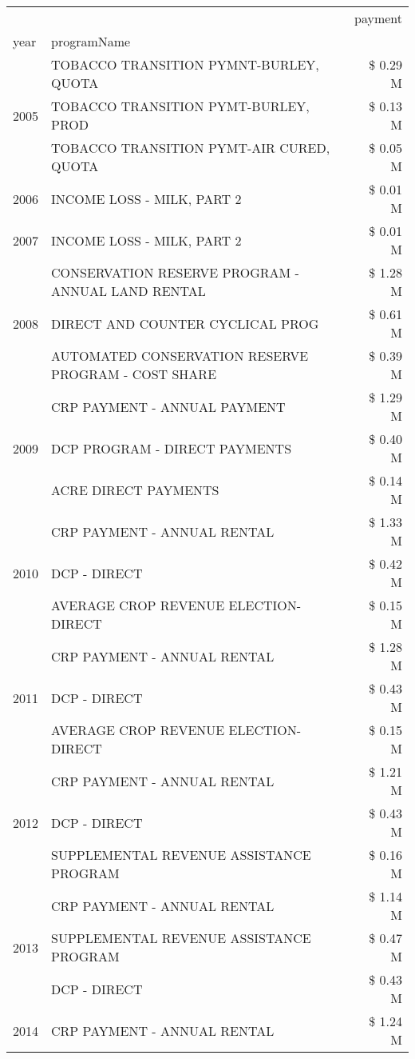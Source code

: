 \begin{tabular}{llr}
\toprule
 &  & payment \\
year & programName &  \\
\midrule
\multirow[t]{3}{*}{2005} & TOBACCO TRANSITION PYMNT-BURLEY, QUOTA & \$ 0.29 M \\
 & TOBACCO TRANSITION PYMT-BURLEY, PROD & \$ 0.13 M \\
 & TOBACCO TRANSITION PYMT-AIR CURED, QUOTA & \$ 0.05 M \\
\cline{1-3}
2006 & INCOME LOSS - MILK, PART 2 & \$ 0.01 M \\
\cline{1-3}
2007 & INCOME LOSS - MILK, PART 2 & \$ 0.01 M \\
\cline{1-3}
\multirow[t]{3}{*}{2008} & CONSERVATION RESERVE PROGRAM - ANNUAL LAND RENTAL & \$ 1.28 M \\
 & DIRECT AND COUNTER CYCLICAL PROG & \$ 0.61 M \\
 & AUTOMATED CONSERVATION RESERVE PROGRAM - COST SHARE & \$ 0.39 M \\
\cline{1-3}
\multirow[t]{3}{*}{2009} & CRP PAYMENT - ANNUAL PAYMENT & \$ 1.29 M \\
 & DCP PROGRAM - DIRECT PAYMENTS & \$ 0.40 M \\
 & ACRE DIRECT PAYMENTS & \$ 0.14 M \\
\cline{1-3}
\multirow[t]{3}{*}{2010} & CRP PAYMENT - ANNUAL RENTAL & \$ 1.33 M \\
 & DCP - DIRECT & \$ 0.42 M \\
 & AVERAGE CROP REVENUE ELECTION-DIRECT & \$ 0.15 M \\
\cline{1-3}
\multirow[t]{3}{*}{2011} & CRP PAYMENT - ANNUAL RENTAL & \$ 1.28 M \\
 & DCP - DIRECT & \$ 0.43 M \\
 & AVERAGE CROP REVENUE ELECTION-DIRECT & \$ 0.15 M \\
\cline{1-3}
\multirow[t]{3}{*}{2012} & CRP PAYMENT - ANNUAL RENTAL & \$ 1.21 M \\
 & DCP - DIRECT & \$ 0.43 M \\
 & SUPPLEMENTAL REVENUE ASSISTANCE PROGRAM & \$ 0.16 M \\
\cline{1-3}
\multirow[t]{3}{*}{2013} & CRP PAYMENT - ANNUAL RENTAL & \$ 1.14 M \\
 & SUPPLEMENTAL REVENUE ASSISTANCE PROGRAM & \$ 0.47 M \\
 & DCP - DIRECT & \$ 0.43 M \\
\cline{1-3}
\multirow[t]{3}{*}{2014} & CRP PAYMENT - ANNUAL RENTAL & \$ 1.24 M \\

\end{tabular}
